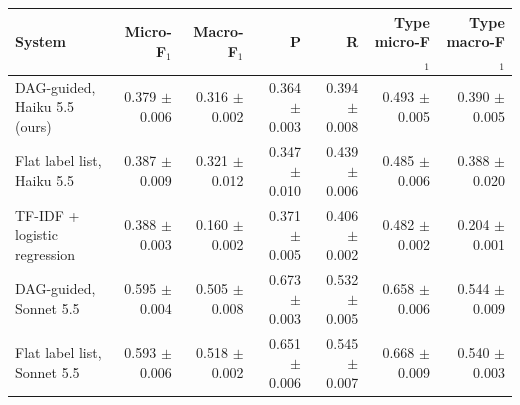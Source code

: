 \setlength{\tabcolsep}{3pt}
\begin{tabular}{@{}lrrrrrr@{}}
    \toprule
    System & Micro-F$_1$ & Macro-F$_1$ & P & R & Type micro-F$_1$ & Type macro-F$_1$ \\
    \midrule
    DAG-guided, Haiku 5.5 (ours) & 0.379 $\pm$ 0.006 & 0.316 $\pm$ 0.002 & 0.364 $\pm$ 0.003 & 0.394 $\pm$ 0.008 & 0.493 $\pm$ 0.005 & 0.390 $\pm$ 0.005 \\
    Flat label list, Haiku 5.5 & 0.387 $\pm$ 0.009 & 0.321 $\pm$ 0.012 & 0.347 $\pm$ 0.010 & 0.439 $\pm$ 0.006 & 0.485 $\pm$ 0.006 & 0.388 $\pm$ 0.020 \\
    TF-IDF + logistic regression & 0.388 $\pm$ 0.003 & 0.160 $\pm$ 0.002 & 0.371 $\pm$ 0.005 & 0.406 $\pm$ 0.002 & 0.482 $\pm$ 0.002 & 0.204 $\pm$ 0.001 \\
    DAG-guided, Sonnet 5.5 & 0.595 $\pm$ 0.004 & 0.505 $\pm$ 0.008 & 0.673 $\pm$ 0.003 & 0.532 $\pm$ 0.005 & 0.658 $\pm$ 0.006 & 0.544 $\pm$ 0.009 \\
    Flat label list, Sonnet 5.5 & 0.593 $\pm$ 0.006 & 0.518 $\pm$ 0.002 & 0.651 $\pm$ 0.006 & 0.545 $\pm$ 0.007 & 0.668 $\pm$ 0.009 & 0.540 $\pm$ 0.003 \\
    \bottomrule
\end{tabular}
